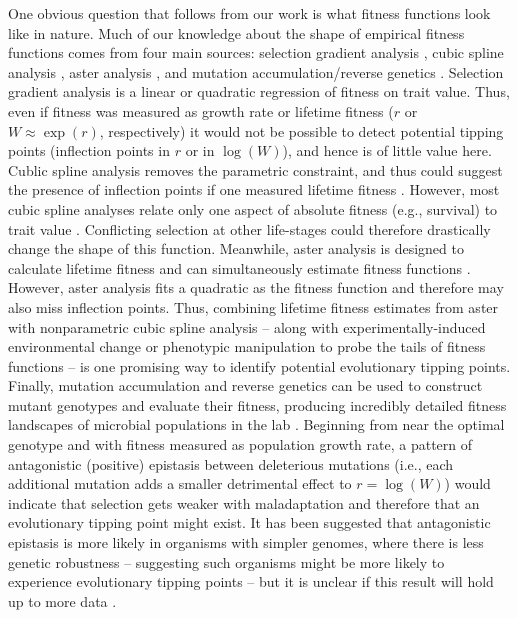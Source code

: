 \documentclass[12pt,letterpaper]{article} %
\begin{document}
One obvious question that follows from our work is what fitness functions look like in nature.
Much of our knowledge about the shape of empirical fitness functions comes from four main sources: selection gradient analysis \citep{Lande1983}, cubic spline analysis \citep{Schluter1988}, aster analysis \citep{Shaw2008,Shaw2010}, and mutation accumulation/reverse genetics \citep[reviewed in][]{deVisser2014}.
Selection gradient analysis is a linear or quadratic regression of fitness on trait value.
Thus, even if fitness was measured as growth rate or lifetime fitness ($r$ or $W \approx \exp(r)$, respectively) it would not be possible to detect potential tipping points (inflection points in $r$ or in $\log(W)$), and hence is of little value here.
Cublic spline analysis removes the parametric constraint, and thus could suggest the presence of inflection points if one measured lifetime fitness \citep[e.g.,][]{Reale2003a,Wilson2005}.
However, most cubic spline analyses relate only one aspect of absolute fitness (e.g., survival) to trait value \citep[e.g., Figure 4 in][]{Reimchen2002}.
Conflicting selection at other life-stages \citep[e.g.,][]{Robinson2006} could therefore drastically change the shape of this function.
Meanwhile, aster analysis is designed to calculate lifetime fitness and can simultaneously estimate fitness functions \citep[e.g., Figure A2 in][]{Shaw2008}.
However, aster analysis fits a quadratic as the fitness function \citep[parametric bootstrap on a scaled measure of fitness;][]{Shaw2008} and therefore may also miss inflection points.
Thus, combining lifetime fitness estimates from aster with nonparametric cubic spline analysis --  along with experimentally-induced environmental change \citep[e.g.,][]{Weis2014} or phenotypic manipulation \citep[e.g.,][]{Sinervo1992,Simons2009} to probe the tails of fitness functions --  is one promising way to identify potential evolutionary tipping points.
Finally, mutation accumulation and reverse genetics can be used to construct mutant genotypes and evaluate their fitness, producing incredibly detailed fitness landscapes of microbial populations in the lab \citep[e.g., Figure 2 in][]{Bank2016}.
Beginning from near the optimal genotype and with fitness measured as population growth rate, a pattern of antagonistic (positive) epistasis between deleterious mutations (i.e., each additional mutation adds a smaller detrimental effect to $r=\log(W)$) would indicate that selection gets weaker with maladaptation and therefore that an evolutionary tipping point might exist.
It has been suggested that antagonistic epistasis is more likely in organisms with simpler genomes, where there is less genetic robustness \citep[][]{Sanjuan2006} -- suggesting such organisms might be more likely to experience evolutionary tipping points -- but it is unclear if this result will hold up to more data \citep{Agrawal2010}.
\end{document}
